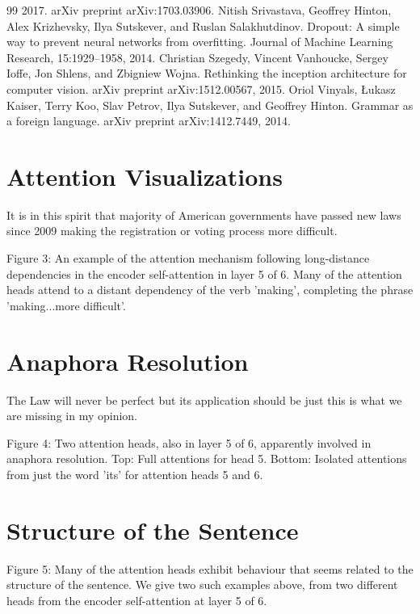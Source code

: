 \documentclass[conference]{IEEEtran}
\begin{document}
\begin{thebibliography}{99}
 2017. arXiv preprint arXiv:1703.03906.
 Nitish Srivastava, Geoffrey Hinton, Alex Krizhevsky, Ilya Sutskever, and Ruslan Salakhutdinov. Dropout: A simple way to prevent neural networks from overfitting. Journal of Machine Learning Research, 15:1929–1958, 2014.
 Christian Szegedy, Vincent Vanhoucke, Sergey Ioffe, Jon Shlens, and Zbigniew Wojna. Rethinking the inception architecture for computer vision. arXiv preprint arXiv:1512.00567, 2015.
 Oriol Vinyals, Łukasz Kaiser, Terry Koo, Slav Petrov, Ilya Sutskever, and Geoffrey Hinton. Grammar as a foreign language. arXiv preprint arXiv:1412.7449, 2014.

\section{Attention Visualizations}
It is in this spirit that majority of American governments have passed new laws since 2009 making the registration or voting process more difficult.

Figure 3: An example of the attention mechanism following long-distance dependencies in the encoder self-attention in layer 5 of 6. Many of the attention heads attend to a distant dependency of the verb 'making', completing the phrase 'making...more difficult'. 

\section{Anaphora Resolution}
The Law will never be perfect but its application should be just this is what we are missing in my opinion.

Figure 4: Two attention heads, also in layer 5 of 6, apparently involved in anaphora resolution. Top: Full attentions for head 5. Bottom: Isolated attentions from just the word 'its' for attention heads 5 and 6.

\section{Structure of the Sentence}
Figure 5: Many of the attention heads exhibit behaviour that seems related to the structure of the sentence. We give two such examples above, from two different heads from the encoder self-attention at layer 5 of 6.


\end{thebibliography}
\end{document}
